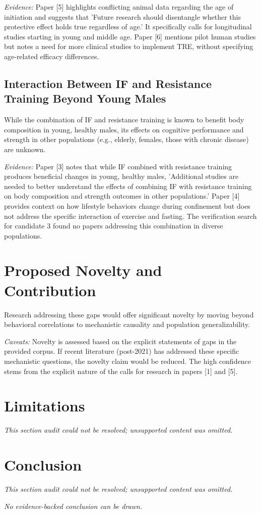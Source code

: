 \documentclass[11pt]{article}
\begin{document}
\textit{Evidence:} Paper [5] highlights conflicting animal data regarding the age of initiation and suggests that 'Future research should disentangle whether this protective effect holds true regardless of age.' It specifically calls for longitudinal studies starting in young and middle age. Paper [6] mentions pilot human studies but notes a need for more clinical studies to implement TRE, without specifying age-related efficacy differences.

\subsection{Interaction Between IF and Resistance Training Beyond Young Males}
While the combination of IF and resistance training is known to benefit body composition in young, healthy males, its effects on cognitive performance and strength in other populations (e.g., elderly, females, those with chronic disease) are unknown.

\textit{Evidence:} Paper [3] notes that while IF combined with resistance training produces beneficial changes in young, healthy males, 'Additional studies are needed to better understand the effects of combining IF with resistance training on body composition and strength outcomes in other populations.' Paper [4] provides context on how lifestyle behaviors change during confinement but does not address the specific interaction of exercise and fasting. The verification search for candidate 3 found no papers addressing this combination in diverse populations.

\section{Proposed Novelty and Contribution}
Research addressing these gaps would offer significant novelty by moving beyond behavioral correlations to mechanistic causality and population generalizability.

\textit{Caveats:} Novelty is assessed based on the explicit statements of gaps in the provided corpus. If recent literature (post-2021) has addressed these specific mechanistic questions, the novelty claim would be reduced. The high confidence stems from the explicit nature of the calls for research in papers [1] and [5].

\section{Limitations}
\textit{This section audit could not be resolved; unsupported content was omitted.}

\section{Conclusion}
\textit{This section audit could not be resolved; unsupported content was omitted.}

\textit{No evidence-backed conclusion can be drawn.}
\end{document}
